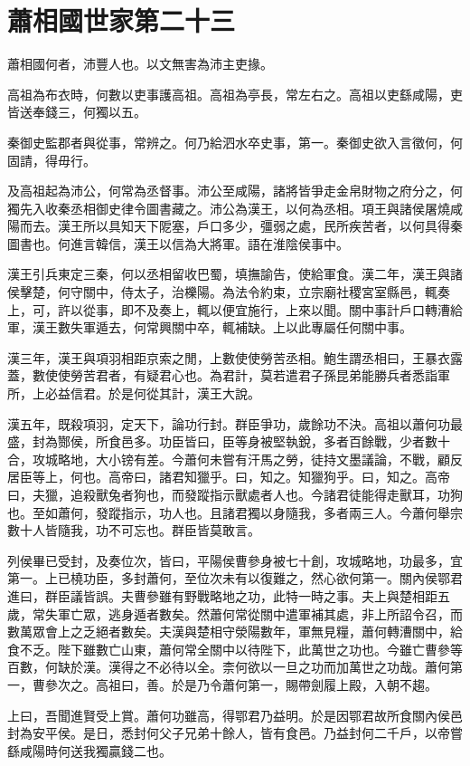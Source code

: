 \chapter{蕭相國世家第二十三}

蕭相國何者，沛豐人也。以文無害為沛主吏掾。

高祖為布衣時，何數以吏事護高祖。高祖為亭長，常左右之。高祖以吏繇咸陽，吏皆送奉錢三，何獨以五。

秦御史監郡者與從事，常辨之。何乃給泗水卒史事，第一。秦御史欲入言徵何，何固請，得毋行。

及高祖起為沛公，何常為丞督事。沛公至咸陽，諸將皆爭走金帛財物之府分之，何獨先入收秦丞相御史律令圖書藏之。沛公為漢王，以何為丞相。項王與諸侯屠燒咸陽而去。漢王所以具知天下阸塞，戶口多少，彊弱之處，民所疾苦者，以何具得秦圖書也。何進言韓信，漢王以信為大將軍。語在淮陰侯事中。

漢王引兵東定三秦，何以丞相留收巴蜀，填撫諭告，使給軍食。漢二年，漢王與諸侯擊楚，何守關中，侍太子，治櫟陽。為法令約束，立宗廟社稷宮室縣邑，輒奏上，可，許以從事，即不及奏上，輒以便宜施行，上來以聞。關中事計戶口轉漕給軍，漢王數失軍遁去，何常興關中卒，輒補缺。上以此專屬任何關中事。

漢三年，漢王與項羽相距京索之閒，上數使使勞苦丞相。鮑生謂丞相曰，王暴衣露蓋，數使使勞苦君者，有疑君心也。為君計，莫若遣君子孫昆弟能勝兵者悉詣軍所，上必益信君。於是何從其計，漢王大說。

漢五年，既殺項羽，定天下，論功行封。群臣爭功，歲餘功不決。高祖以蕭何功最盛，封為酂侯，所食邑多。功臣皆曰，臣等身被堅執銳，多者百餘戰，少者數十合，攻城略地，大小镑有差。今蕭何未嘗有汗馬之勞，徒持文墨議論，不戰，顧反居臣等上，何也。高帝曰，諸君知獵乎。曰，知之。知獵狗乎。曰，知之。高帝曰，夫獵，追殺獸兔者狗也，而發蹤指示獸處者人也。今諸君徒能得走獸耳，功狗也。至如蕭何，發蹤指示，功人也。且諸君獨以身隨我，多者兩三人。今蕭何舉宗數十人皆隨我，功不可忘也。群臣皆莫敢言。

列侯畢已受封，及奏位次，皆曰，平陽侯曹參身被七十創，攻城略地，功最多，宜第一。上已橈功臣，多封蕭何，至位次未有以復難之，然心欲何第一。關內侯鄂君進曰，群臣議皆誤。夫曹參雖有野戰略地之功，此特一時之事。夫上與楚相距五歲，常失軍亡眾，逃身遁者數矣。然蕭何常從關中遣軍補其處，非上所詔令召，而數萬眾會上之乏絕者數矣。夫漢與楚相守滎陽數年，軍無見糧，蕭何轉漕關中，給食不乏。陛下雖數亡山東，蕭何常全關中以待陛下，此萬世之功也。今雖亡曹參等百數，何缺於漢。漢得之不必待以全。柰何欲以一旦之功而加萬世之功哉。蕭何第一，曹參次之。高祖曰，善。於是乃令蕭何第一，賜帶劍履上殿，入朝不趨。

上曰，吾聞進賢受上賞。蕭何功雖高，得鄂君乃益明。於是因鄂君故所食關內侯邑封為安平侯。是日，悉封何父子兄弟十餘人，皆有食邑。乃益封何二千戶，以帝嘗繇咸陽時何送我獨贏錢二也。

